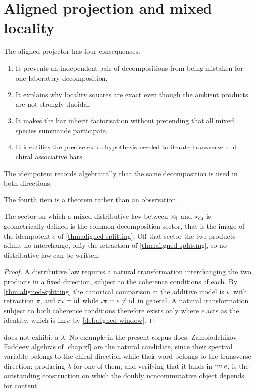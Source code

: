 \section{Aligned projection and mixed locality}
The aligned projector has four consequences.
\begin{enumerate}
\item It prevents an independent pair of decompositions from being mistaken for one laboratory decomposition.
\item It explains why locality squares are exact even though the ambient products are not strongly duoidal.
\item It makes the bar inherit factorisation without pretending that all mixed species summands participate.
\item It identifies the precise extra hypothesis needed to iterate transverse and chiral associative bars.
\end{enumerate}
The idempotent records algebraically that the same decomposition is used in
both directions.

The fourth item is a theorem rather than an observation.

\begin{proposition}\label{prop:lambda-sector}
The sector on which a mixed distributive law between \(\mathbin{\otimes_{!}}\) and
\(\mathbin{\star_{\mathrm{ch}}}\) is geometrically defined is the common-decomposition sector, that is
the image of the idempotent \(e\) of \cref{thm:aligned-splitting}.  Off that
sector the two products admit no interchange, only the retraction of
\cref{thm:aligned-splitting}, so no distributive law can be written.
\end{proposition}
\begin{proof}
A distributive law requires a natural transformation interchanging the two
products in a fixed direction, subject to the coherence conditions of each.  By
\cref{thm:aligned-splitting} the canonical comparison in the additive model is
\(\iota\), with retraction \(\pi\), and \(\pi\iota=\operatorname{id}\) while \(\iota\pi=e\neq\operatorname{id}\)
in general.  A natural transformation subject to both coherence conditions
therefore exists only where \(e\) acts as the identity, which is \(\operatorname{im} e\) by
\cref{def:aligned-window}.
\end{proof}

\begin{remark}
 does not exhibit a \(\lambda\).  No example in the
present corpus does.  Zamolodchikov--Faddeev algebras of \cref{chap:zf} are the
natural candidate, since their spectral variable belongs to the chiral direction
while their word belongs to the transverse direction; producing \(\lambda\) for
one of them, and verifying that it lands in \(\operatorname{im} e\), is the outstanding
construction on which the doubly noncommutative object depends for content.
\end{remark}

